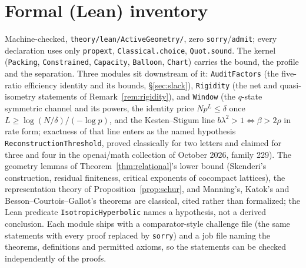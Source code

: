 \documentclass[11pt,reqno]{amsart}
\theoremstyle{plain}
\theoremstyle{definition}
\begin{document}
\section{Formal (Lean) inventory}
Machine-checked, \texttt{theory/lean/ActiveGeometry/}, zero \texttt{sorry}/\texttt{admit}; every declaration uses
only \texttt{propext}, \texttt{Classical.choice}, \texttt{Quot.sound}. The kernel (\texttt{Packing},
\texttt{Constrained}, \texttt{Capacity}, \texttt{Balloon}, \texttt{Chart}) carries the bound, the profile and the
separation. Three modules sit downstream of it: \texttt{AuditFactors} (the five-ratio efficiency identity and its
bounds, \S\ref{sec:slack}), \texttt{Rigidity} (the net and quasi-isometry statements of Remark~\ref{rem:rigidity}),
and \texttt{Window} (the $q$-state symmetric channel and its powers, the identity price $N p^L\le\delta$ once
$L\ge\log(N/\delta)/(-\log p)$, and the Kesten--Stigum line $b\lambda^2>1\iff\beta>2\rho$ in rate form; exactness of
that line enters as the named hypothesis \texttt{ReconstructionThreshold}, proved classically for two letters and
claimed for three and four in the openai/math collection of October 2026, family 229). The geometry lemmas of
Theorem~\ref{thm:relational}'s lower bound (Skenderi's construction, residual finiteness, critical exponents of
cocompact lattices), the representation theory of Proposition~\ref{prop:schur}, and Manning's, Katok's and
Besson--Courtois--Gallot's theorems are classical, cited rather than formalized; the Lean predicate
\texttt{IsotropicHyperbolic} names a hypothesis, not a derived conclusion. Each module ships with a comparator-style
challenge file (the same statements with every proof replaced by \texttt{sorry}) and a job file naming the theorems,
definitions and permitted axioms, so the statements can be checked independently of the proofs.
\end{document}
